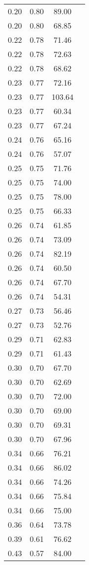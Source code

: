 \begin{longtable}[H]{ c c c c }
	 0.20 & 0.80 & 89.00 & \cite{Friak2012}\\
	 0.20 & 0.80 & 68.85 & \cite{Karre2015}\\
	 0.22 & 0.78 & 71.46 & \cite{Ozaki2004}\\
	 0.22 & 0.78 & 72.63 & \cite{Karre2015}\\
	 0.22 & 0.78 & 68.62 & \cite{Karre2015}\\
	 0.23 & 0.77 & 72.16 & \cite{Timoshevskii2011}\\
	 0.23 & 0.77 & 103.64 & \cite{Ozaki2004}\\
	 0.23 & 0.77 & 60.34 & \cite{Karre2015}\\
	 0.23 & 0.77 & 67.24 & \cite{Karre2015}\\
	 0.24 & 0.76 & 65.16 & \cite{Karre2015}\\
	 0.24 & 0.76 & 57.07 & \cite{Karre2015}\\
	 0.25 & 0.75 & 71.76 & \cite{Timoshevskii2011}\\
	 0.25 & 0.75 & 74.00 & \cite{Friak2012}\\
	 0.25 & 0.75 & 78.00 & \cite{Friak2012}\\
	 0.25 & 0.75 & 66.33 & \cite{Ozaki2004}\\
	 0.26 & 0.74 & 61.85 & \cite{Karre2015}\\
	 0.26 & 0.74 & 73.09 & \cite{Karre2015}\\
	 0.26 & 0.74 & 82.19 & \cite{Ozaki2004}\\
	 0.26 & 0.74 & 60.50 & \cite{Ozaki2004}\\
	 0.26 & 0.74 & 67.70 & \cite{Timoshevskii2011}\\
	 0.26 & 0.74 & 54.31 & \cite{Karre2015}\\
	 0.27 & 0.73 & 56.46 & \cite{Karre2015}\\
	 0.27 & 0.73 & 52.76 & \cite{Karre2015}\\
	 0.29 & 0.71 & 62.83 & \cite{Ozaki2004}\\
	 0.29 & 0.71 & 61.43 & \cite{Ozaki2004}\\
	 0.30 & 0.70 & 67.70 & \cite{Timoshevskii2011}\\
	 0.30 & 0.70 & 62.69 & \cite{Karre2015}\\
	 0.30 & 0.70 & 72.00 & \cite{Friak2012}\\
	 0.30 & 0.70 & 69.00 & \cite{Friak2012}\\
	 0.30 & 0.70 & 69.31 & \cite{Karre2015}\\
	 0.30 & 0.70 & 67.96 & \cite{Ozaki2004}\\
	 0.34 & 0.66 & 76.21 & \cite{Karre2015}\\
	 0.34 & 0.66 & 86.02 & \cite{Karre2015}\\
	 0.34 & 0.66 & 74.26 & \cite{Ozaki2004}\\
	 0.34 & 0.66 & 75.84 & \cite{Karre2015}\\
	 0.34 & 0.66 & 75.00 & \cite{Timoshevskii2011}\\
	 0.36 & 0.64 & 73.78 & \cite{Timoshevskii2011}\\
	 0.39 & 0.61 & 76.62 & \cite{Timoshevskii2011}\\
	 0.43 & 0.57 & 84.00 & \cite{Ozaki2004}\\
\end{longtable}
